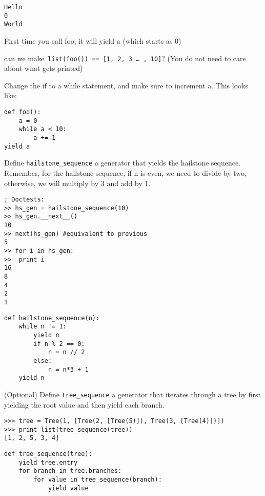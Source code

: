 \documentclass{exam}
\begin{document}
\begin{questions}
\begin{blocksection}
\begin{solution}
\begin{lstlisting}
Hello
0
World
\end{lstlisting}
First time you call foo, it will yield a (which starts as 0)
\end{solution}

\questionHow can we make\texttt{ list(foo()) == [1, 2, 3 … , 10]}?  (You do not need to care about what gets printed)

\begin{solution}[0.75in]
Change the if to a while statement, and make sure to increment a. This looks like: 

\begin{lstlisting}
def foo():
	a = 0
	while a < 10:
		a += 1
yield a
\end{lstlisting}
\end{solution}
\end{blocksection}

\begin{blocksection}
\question Define \texttt{hailstone_sequence} a generator that yields the hailstone sequence. Remember, for the hailstone sequence, if n is even, we need to divide by two, otherwise, we will multiply by 3 and add by 1. 

\begin{lstlisting}
; Doctests:
>> hs_gen = hailstone_sequence(10)
>> hs_gen.__next__()
10
>> next(hs_gen) #equivalent to previous
5
>> for i in hs_gen:
>>	print i
16
8
4
2
1
\end{lstlisting}

\begin{solution}[0.5in]
\begin{lstlisting}
def hailstone_sequence(n):
	while n != 1:
		yield n
		if n % 2 == 0:
			n = n // 2
		else:
			n = n*3 + 1
	yield n
\end{lstlisting}
\end{solution}
\end{blocksection}

\question (Optional) Define \texttt{tree_sequence} a generator that iterates through a tree by first yielding the root value and then yield each branch.
\begin{lstlisting}
>>> tree = Tree(1, [Tree(2, [Tree(5)]), Tree(3, [Tree(4)])])
>>> print list(tree_sequence(tree))
[1, 2, 5, 3, 4]
\end{lstlisting}

\begin{solution}[0.5in]
\begin{lstlisting}
def tree_sequence(tree):
	yield tree.entry
	for branch in tree.branches:
		for value in tree_sequence(branch):
			yield value
\end{lstlisting}
\end{solution}
\end{questions}

\end{document}
